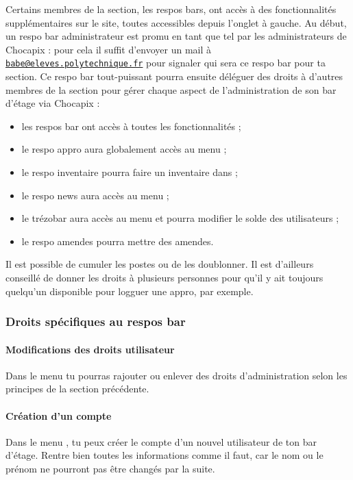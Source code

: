 \documentclass[12pt,french]{article}
\begin{document}
Certains membres de la section, les respos bars, ont accès à des fonctionnalités supplémentaires sur le site, toutes accessibles depuis l'onglet  à gauche. Au début, un respo bar administrateur est promu en tant que tel par les administrateurs de Chocapix : pour cela il suffit d'envoyer un mail à \href{mailto:babe@eleves.polytechnique.fr}{\texttt{babe@eleves.polytechnique.fr}} pour signaler qui sera ce respo bar pour ta section. Ce respo bar tout-puissant pourra ensuite déléguer des droits à d'autres membres de la section pour gérer chaque aspect de l'administration de son bar d'étage via Chocapix :
\begin{itemize}
	\item les respos bar ont accès à toutes les fonctionnalités ;
	\item le respo appro aura globalement accès au menu  ;
	\item le respo inventaire pourra faire un inventaire dans  ;
	\item le respo news aura accès au menu  ;
	\item le trézobar aura accès au menu  et pourra modifier le solde des utilisateurs ;
	\item le respo amendes pourra mettre des amendes.
\end{itemize}
Il est possible de cumuler les postes ou de les doublonner. Il est d'ailleurs conseillé de donner les droits à plusieurs personnes pour qu'il y ait toujours quelqu'un disponible pour logguer une appro, par exemple.

\subsubsection{Droits spécifiques au respos bar}

\paragraph{Modifications des droits utilisateur} Dans le menu  tu pourras rajouter ou enlever des droits d'administration selon les principes de la section précédente.

\paragraph{Création d'un compte} Dans le menu , tu peux créer le compte d'un nouvel utilisateur de ton bar d'étage. Rentre bien toutes les informations comme il faut, car le nom ou le prénom ne pourront pas être changés par la suite.
\end{document}
